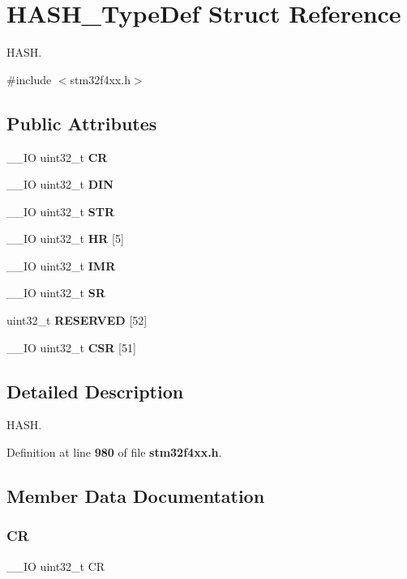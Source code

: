 \section{H\+A\+S\+H\+\_\+\+Type\+Def Struct Reference}
\label{structHASH__TypeDef}


H\+A\+SH.  




{\ttfamily \#include $<$stm32f4xx.\+h$>$}

\subsection*{Public Attributes}
\begin{DoxyCompactItemize}
\item 
\+\_\+\+\_\+\+IO uint32\+\_\+t \textbf{ CR}
\item 
\+\_\+\+\_\+\+IO uint32\+\_\+t \textbf{ D\+IN}
\item 
\+\_\+\+\_\+\+IO uint32\+\_\+t \textbf{ S\+TR}
\item 
\+\_\+\+\_\+\+IO uint32\+\_\+t \textbf{ HR} [5]
\item 
\+\_\+\+\_\+\+IO uint32\+\_\+t \textbf{ I\+MR}
\item 
\+\_\+\+\_\+\+IO uint32\+\_\+t \textbf{ SR}
\item 
uint32\+\_\+t \textbf{ R\+E\+S\+E\+R\+V\+ED} [52]
\item 
\+\_\+\+\_\+\+IO uint32\+\_\+t \textbf{ C\+SR} [51]
\end{DoxyCompactItemize}


\subsection{Detailed Description}
H\+A\+SH. 

Definition at line \textbf{ 980} of file \textbf{ stm32f4xx.\+h}.



\subsection{Member Data Documentation}
\mbox{\label{structHASH__TypeDef_ab40c89c59391aaa9d9a8ec011dd0907a}} 
\subsubsection{CR}
{\footnotesize\ttfamily \+\_\+\+\_\+\+IO uint32\+\_\+t CR}

